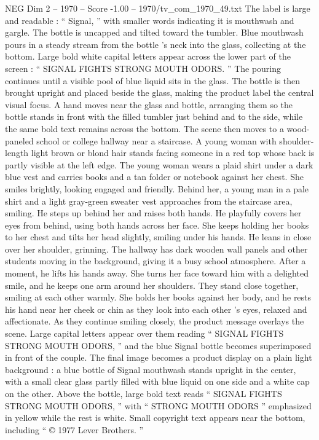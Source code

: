 \begin{textsample}{NEG Dim 2 – 1970 – Score -1.00 – 1970/tv\_com\_1970\_49.txt}
The label is large and readable : “ Signal, ” with smaller words indicating it is mouthwash and gargle.
The bottle is uncapped and tilted toward the tumbler.
Blue mouthwash pours in a steady stream from the bottle ’s neck into the glass, collecting at the bottom.
Large bold white capital letters appear across the lower part of the screen : “ SIGNAL FIGHTS STRONG MOUTH ODORS. ” The pouring continues until a visible pool of blue liquid sits in the glass.
The bottle is then brought upright and placed beside the glass, making the product label the central visual focus.
A hand moves near the glass and bottle, arranging them so the bottle stands in front with the filled tumbler just behind and to the side, while the same bold text remains across the bottom.
The scene then moves to a wood-paneled school or college hallway near a staircase.
A young woman with shoulder-length light brown or blond hair stands facing someone in a red top whose back is partly visible at the left edge.
The young woman wears a plaid shirt under a dark blue vest and carries books and a tan folder or notebook against her chest.
She smiles brightly, looking engaged and friendly.
Behind her, a young man in a pale shirt and a light gray-green sweater vest approaches from the staircase area, smiling.
He steps up behind her and raises both hands.
He playfully covers her eyes from behind, using both hands across her face.
She keeps holding her books to her chest and tilts her head slightly, smiling under his hands.
He leans in close over her shoulder, grinning.
The hallway has dark wooden wall panels and other students moving in the background, giving it a busy school atmosphere.
After a moment, he lifts his hands away.
She turns her face toward him with a delighted smile, and he keeps one arm around her shoulders.
They stand close together, smiling at each other warmly.
She holds her books against her body, and he rests his hand near her cheek or chin as they look into each other ’s eyes, relaxed and affectionate.
As they continue smiling closely, the product message overlays the scene.
Large capital letters appear over them reading “ SIGNAL FIGHTS STRONG MOUTH ODORS, ” and the blue Signal bottle becomes superimposed in front of the couple.
The final image becomes a product display on a plain light background : a blue bottle of Signal mouthwash stands upright in the center, with a small clear glass partly filled with blue liquid on one side and a white cap on the other.
Above the bottle, large bold text reads “ SIGNAL FIGHTS STRONG MOUTH ODORS, ” with “ STRONG MOUTH ODORS ” emphasized in yellow while the rest is white.
Small copyright text appears near the bottom, including “ {\EmojiFont ©} 1977 Lever Brothers. ”

\end{textsample}
